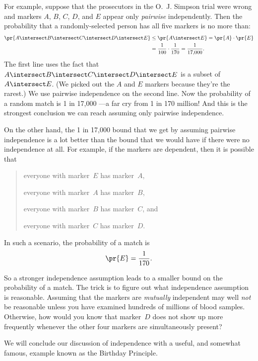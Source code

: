 For example, suppose that the prosecutors in the O.~J. Simpson trial
were wrong and markers $A$, $B$, $C$, $D$, and $E$ appear only
\emph{pairwise} independently.  Then the probability that a
randomly-selected person has all five markers is no more than:
%
\begin{align*}
\pr{A \intersect B \intersect C \intersect D \intersect E}
    & \leq \pr{A \intersect E} = \pr{A} \cdot \pr{E}\\
    & = \frac{1}{100} \cdot \frac{1}{170} = \frac{1}{17{,}000}.
\end{align*}
%
The first line uses the fact that $A \intersect B \intersect C \intersect
D \intersect E$ is a subset of $A \intersect E$.  (We picked out the $A$
and $E$ markers because they're the rarest.)  We use pairwise independence
on the second line.  Now the probability of a random match is 1 in
17,000 ---a far cry from 1 in 170 million!  And this is the strongest
conclusion we can reach assuming only pairwise independence.

On the other hand, the 1 in 17,000 bound that we get by assuming
pairwise independence is a lot better than the bound that we would
have if there were no independence at all.  For example, if the
markers are dependent, then it is possible that
\begin{quote}
everyone with marker~$E$ has marker~$A$,

everyone with marker~$A$ has marker~$B$,

everyone with marker~$B$ has marker~$C$, and

everyone with marker~$C$ has marker~$D$.
\end{quote}
In such a scenario, the probability of a match is
\begin{equation*}
    \pr{E} = \frac{1}{170}.
\end{equation*}

So a stronger independence assumption leads to a smaller bound on the
probability of a match.  The trick is to figure out what independence
assumption is reasonable.  Assuming that the markers are
\emph{mutually} independent may well \emph{not} be reasonable unless
you have examined hundreds of millions of blood samples.  Otherwise,
how would you know that marker~$D$ does not show up more frequently
whenever the other four markers are simultaneously present?

We will conclude our discussion of independence with a useful, and
somewhat famous, example known as the Birthday Principle.

\begin{problems}
\examproblems
{}

\classproblems
{}

\homeworkproblems
{}
\end{problems}


